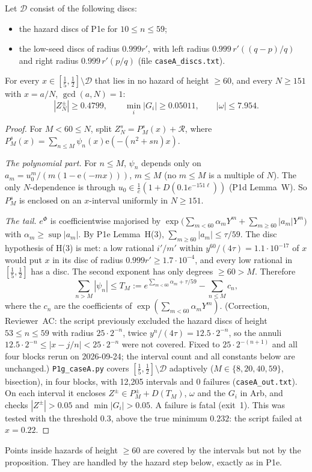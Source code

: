 \documentclass[11pt]{article}
\theoremstyle{definition}\newtheorem{definition}[theorem]{Definition}
\theoremstyle{remark}\newtheorem{remark}[theorem]{Remark}
\newcommand{\e}{\mathrm{e}}
\begin{document}
\begin{proposition}\label{prop:A}
Let $\mathcal D$ consist of the following discs:
\begin{itemize}
\item the hazard discs of P1e for $10\le n\le59$;
\item the low-seed discs of radius $0.999r'$, with left radius $0.999\,r'((q-p)/q)$ and right radius $0.999\,r'(p/q)$ (file \texttt{caseA\_discs.txt}).
\end{itemize}
For every $x\in[\frac15,\frac12]\setminus\mathcal D$ that lies in no hazard of height $\ge60$, and every $N\ge151$ with $x=a/N$, $\gcd(a,N)=1$:
\[|Z^\pm_N|\ge0.4799,\qquad\min_i|G_i|\ge0.05011,\qquad|\omega|\le7.954 .\]
\end{proposition}
\begin{proof}
For $M<60\le N$, split $Z^s_N=P^s_M(x)+\mathcal R$, where $P^s_M(x)=\sum_{n\le M}\psi_n(x)\e(-(n^2+sn)x)$.

\emph{The polynomial part.} For $n\le M$, $\psi_n$ depends only on $a_m=u_0^m/(m(1-\e(-mx)))$, $m\le M$ (no $m\le M$ is a multiple of $N$). The only $N$-dependence is through $u_0\in\frac1c(1+D(0.1e^{-151\ell}))$ (P1d Lemma~W). So $P^s_M$ is enclosed on an $x$-interval uniformly in $N\ge151$.

\emph{The tail.} $e^\Phi$ is coefficientwise majorised by $\exp\big(\sum_{m<60}\alpha_mY^m+\sum_{m\ge60}|a_m|Y^m\big)$ with $\alpha_m\ge\sup|a_m|$. By P1e Lemma~H(3), $\sum_{m\ge60}|a_m|\le\tau/59$. The disc hypothesis of H(3) is met: a low rational $i'/m'$ within $y^{60}/(4\tau)=1.1\cdot10^{-17}$ of $x$ would put $x$ in its disc of radius $0.999r'\ge1.7\cdot10^{-4}$, and every low rational in $[\frac15,\frac12]$ has a disc. The second exponent has only degrees $\ge60>M$. Therefore
\[\sum_{n>M}|\psi_n|\le T_M:=e^{\sum_{m<60}\alpha_m+\tau/59}-\sum_{n\le M}c_n,\]
where the $c_n$ are the coefficients of $\exp(\sum_{m<60}\alpha_mY^m)$.
(Correction, Reviewer~AC: the script previously excluded the hazard discs of height $53\le n\le59$ with radius $25\cdot2^{-n}$, twice $y^n/(4\tau)=12.5\cdot2^{-n}$, so the annuli $12.5\cdot2^{-n}\le|x-j/n|<25\cdot2^{-n}$ were not covered. Fixed to $25\cdot2^{-(n+1)}$ and all four blocks rerun on 2026-09-24; the interval count and all constants below are unchanged.)
\texttt{P1g\_caseA.py} covers $[\frac15,\frac12]\setminus\mathcal D$ adaptively ($M\in\{8,20,40,59\}$, bisection), in four blocks, with 12,205 intervals and 0 failures (\texttt{caseA\_out.txt}). On each interval it encloses $Z^\pm\in P^\pm_M+D(T_M)$, $\omega$ and the $G_i$ in Arb, and checks $|Z^\pm|>0.05$ and $\min|G_i|>0.05$.
A failure is fatal (exit~1). This was tested with the threshold $0.3$, above the true minimum $0.232$: the script failed at $x=0.22$.
\end{proof}
Points inside hazards of height $\ge60$ are covered by the intervals but not by the proposition. They are handled by the hazard step below, exactly as in P1e.
\end{document}
